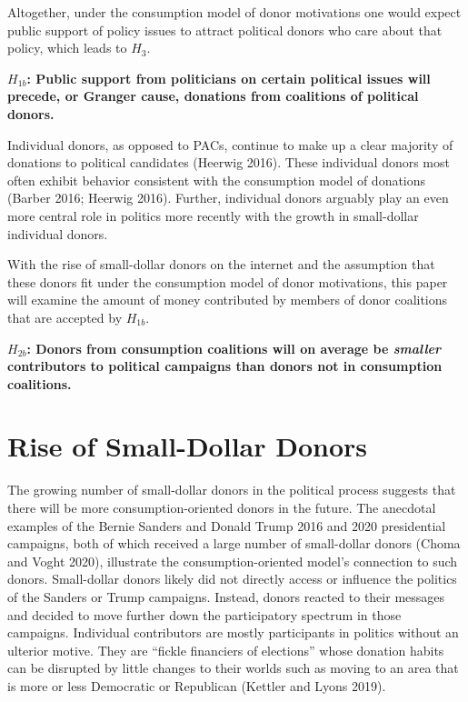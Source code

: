 \documentclass[12pt,]{article}
\begin{document}
Altogether, under the consumption model of donor motivations one would
expect public support of policy issues to attract political donors who
care about that policy, which leads to \(H_{3}\).

\textbf{\(H_{1b}\): Public support from politicians on certain political
issues will precede, or Granger cause, donations from coalitions of
political donors.}

Individual donors, as opposed to PACs, continue to make up a clear
majority of donations to political candidates (Heerwig 2016). These
individual donors most often exhibit behavior consistent with the
consumption model of donations (Barber 2016; Heerwig 2016). Further,
individual donors arguably play an even more central role in politics
more recently with the growth in small-dollar individual donors.

With the rise of small-dollar donors on the internet and the assumption
that these donors fit under the consumption model of donor motivations,
this paper will examine the amount of money contributed by members of
donor coalitions that are accepted by \(H_{1b}\).

\textbf{\(H_{2b}\): Donors from consumption coalitions will on average
be \emph{smaller} contributors to political campaigns than donors not in
consumption coalitions.}

\hypertarget{rise-of-small-dollar-donors}{%
\section{Rise of Small-Dollar
Donors}\label{rise-of-small-dollar-donors}}

The growing number of small-dollar donors in the political process
suggests that there will be more consumption-oriented donors in the
future. The anecdotal examples of the Bernie Sanders and Donald Trump
2016 and 2020 presidential campaigns, both of which received a large
number of small-dollar donors (Choma and Voght 2020), illustrate the
consumption-oriented model's connection to such donors. Small-dollar
donors likely did not directly access or influence the politics of the
Sanders or Trump campaigns. Instead, donors reacted to their messages
and decided to move further down the participatory spectrum in those
campaigns. Individual contributors are mostly participants in politics
without an ulterior motive. They are ``fickle financiers of elections''
whose donation habits can be disrupted by little changes to their worlds
such as moving to an area that is more or less Democratic or Republican
(Kettler and Lyons 2019).
\end{document}
